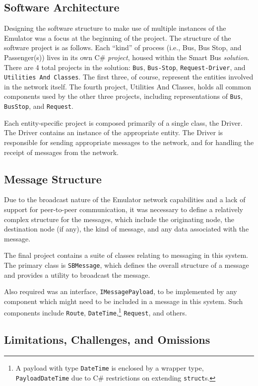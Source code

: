 \documentclass[runningheads]{llncs}
\begin{document}
\subsection{Software Architecture}
Designing the software structure to make use of multiple instances of the Emulator was a focus at the beginning of the project. The structure of the software project is as follows. Each ``kind'' of process (i.e., Bus, Bus Stop, and Passenger(s)) lives in its own C\# \emph{project}, housed within the Smart Bus \emph{solution}. There are 4 total projects in the solution: \lstinline{Bus}, \lstinline{Bus-Stop}, \lstinline{Request-Driver}, and \lstinline{Utilities And Classes}. The first three, of course, represent the entities involved in the network itself. The fourth project, Utilities And Classes, holds all common components used by the other three projects, including representations of \lstinline{Bus}, \lstinline{BusStop}, and \lstinline{Request}.

Each entity-specific project is composed primarily of a single class, the Driver. The Driver contains an instance of the appropriate entity. The Driver is responsible for sending appropriate messages to the network, and for handling the receipt of messages from the network.

\subsection{Message Structure}
Due to the broadcast nature of the Emulator network capabilities and a lack of support for peer-to-peer communication, it was necessary to define a relatively complex structure for the messages, which include the originating node, the destination node (if any), the kind of message, and any data associated with the message.

The final project contains a suite of classes relating to messaging in this system. The primary class is \lstinline{SBMessage}, which defines the overall structure of a message and provides a utility to broadcast the message.

Also required was an interface, \lstinline{IMessagePayload}, to be implemented by any component which might need to be included in a message in this system. Such components include \lstinline{Route}, \lstinline{DateTime},\footnote{A payload with type \lstinline|DateTime| is enclosed by a wrapper type, \lstinline|PayloadDateTime| due to C\# restrictions on extending \lstinline|struct|s.} \lstinline{Request}, and others.


\subsection{Limitations, Challenges, and Omissions}
\end{document}
